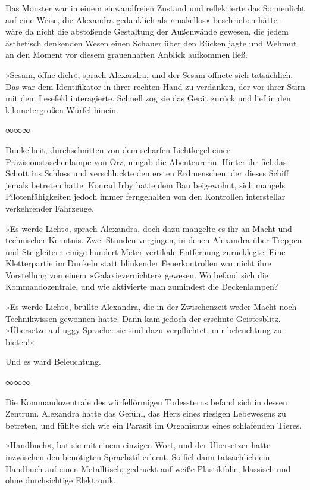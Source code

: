 Das Monster war in einem einwandfreien Zustand und reflektierte das Sonnenlicht auf eine Weise, die Alexandra gedanklich als »makellos« beschrieben hätte~– wäre da nicht die abstoßende Gestaltung der Außenwände gewesen, die jedem ästhetisch denkenden Wesen einen Schauer über den Rücken jagte und Wehmut an den Moment vor diesem grauenhaften Anblick aufkommen ließ.

»Sesam, öffne dich«, sprach Alexandra, und der Sesam öffnete sich tatsächlich. Das war dem Identifikator in ihrer rechten Hand zu verdanken, der vor ihrer Stirn mit dem Lesefeld interagierte. Schnell zog sie das Gerät zurück und lief in den kilometergroßen Würfel hinein.

\begin{center}
∞∞∞
\end{center}

Dunkelheit, durchschnitten von dem scharfen Lichtkegel einer Präzisionstaschenlampe von Örz, umgab die Abenteurerin. Hinter ihr fiel das Schott ins Schloss und verschluckte den ersten Erdmenschen, der dieses Schiff jemals betreten hatte. Konrad Irby hatte dem Bau beigewohnt, sich mangels Pilotenfähigkeiten jedoch immer ferngehalten von den Kontrollen interstellar verkehrender Fahrzeuge.

»Es werde Licht«, sprach Alexandra, doch dazu mangelte es ihr an Macht und technischer Kenntnis. Zwei Stunden vergingen, in denen Alexandra über Treppen und Steigleitern einige hundert Meter vertikale Entfernung zurücklegte. Eine Kletterpartie im Dunkeln statt blinkender Feuerkontrollen war nicht ihre Vorstellung von einem »Galaxievernichter« gewesen. Wo befand sich die Kommandozentrale, und wie aktivierte man zumindest die Deckenlampen?

»Es werde Licht«, brüllte Alexandra, die in der Zwischenzeit weder Macht noch Technikwissen gewonnen hatte. Dann kam jedoch der ersehnte Geistesblitz. »Übersetze auf uggy-Sprache: sie sind dazu verpflichtet, mir beleuchtung zu bieten!«

Und es ward Beleuchtung.

\begin{center}
∞∞∞
\end{center}

Die Kommandozentrale des würfelförmigen Todessterns befand sich in dessen Zentrum. Alexandra hatte das Gefühl, das Herz eines riesigen Lebewesens zu betreten, und fühlte sich wie ein Parasit im Organismus eines schlafenden Tieres.

»Handbuch«, bat sie mit einem einzigen Wort, und der Übersetzer hatte inzwischen den benötigten Sprachstil erlernt. So fiel dann tatsächlich ein Handbuch auf einen Metalltisch, gedruckt auf weiße Plastikfolie, klassisch und ohne durchsichtige Elektronik.

